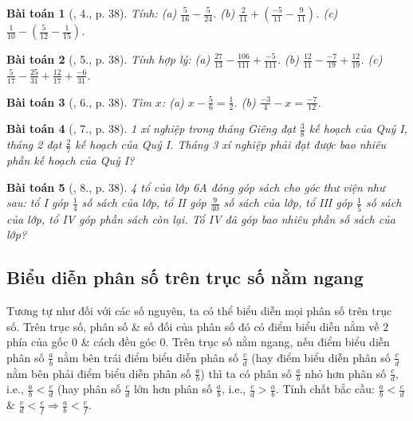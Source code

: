 \documentclass{article}
\newtheorem{baitoan}{Bài toán}
\begin{document}
\begin{baitoan}[\cite{SGK_Toan_6_Canh_Dieu_tap_2}, 4., p. 38]
	Tính: (a) $\frac{5}{16} - \frac{5}{24}$. (b) $\frac{2}{11} + \left(\frac{-5}{11} - \frac{9}{11}\right)$. (c) $\frac{1}{10} - \left(\frac{5}{12} - \frac{1}{15}\right)$.
\end{baitoan}

\begin{baitoan}[\cite{SGK_Toan_6_Canh_Dieu_tap_2}, 5., p. 38]
	Tính hợp lý: (a) $\frac{27}{13} - \frac{106}{111} + \frac{-5}{111}$. (b) $\frac{12}{11} - \frac{-7}{19} + \frac{12}{19}$. (c) $\frac{5}{17} - \frac{25}{31} + \frac{12}{17} + \frac{-6}{31}$.
\end{baitoan}

\begin{baitoan}[\cite{SGK_Toan_6_Canh_Dieu_tap_2}, 6., p. 38]
	Tìm $x$: (a) $x - \frac{5}{6} = \frac{1}{2}$. (b) $\frac{-3}{4} - x = \frac{-7}{12}$.
\end{baitoan}

\begin{baitoan}[\cite{SGK_Toan_6_Canh_Dieu_tap_2}, 7., p. 38]
	1 xí nghiệp trong tháng Giêng đạt $\frac{3}{8}$ kế hoạch của Quý I, tháng 2 đạt $\frac{2}{7}$ kế hoạch của Quý I. Tháng 3 xí nghiệp phải đạt được bao nhiêu phần kế hoạch của Quý I?
\end{baitoan}

\begin{baitoan}[\cite{SGK_Toan_6_Canh_Dieu_tap_2}, 8., p. 38]
	4 tổ của lớp 6A đóng góp sách cho góc thư viện như sau: tổ I góp $\frac{1}{4}$ số sách của lớp, tổ II góp $\frac{9}{40}$ số sách của lớp, tổ III góp $\frac{1}{5}$ số sách của lớp, tổ IV góp phần sách còn lại. Tổ IV đã góp bao nhiêu phần số sách của lớp?
\end{baitoan}

\subsection{Biểu diễn phân số trên trục số nằm ngang}
Tương tự như đối với các số nguyên, ta có thể biểu diễn mọi phân số trên trục số. Trên trục số, phân số \& số đối của phân số đó có điểm biểu diễn nằm về 2 phía của gốc 0 \& cách đều góc 0. Trên trục số nằm ngang, nếu điểm biểu diễn phân số $\frac{a}{b}$ nằm bên trái điểm biểu diễn phân số $\frac{c}{d}$ (hay điểm biểu diễn phân số $\frac{c}{d}$ nằm bên phải điểm biểu diễn phân số $\frac{a}{b}$) thì ta có phân số $\frac{a}{b}$ nhỏ hơn phân số $\frac{c}{d}$, i.e., $\frac{a}{b} < \frac{c}{d}$ (hay phân số $\frac{c}{d}$ lớn hơn phân số $\frac{a}{b}$, i.e., $\frac{c}{d} > \frac{a}{b}$. Tính chất bắc cầu: $\frac{a}{b} < \frac{c}{d}$ \& $\frac{c}{d} < \frac{e}{f}\Rightarrow\frac{a}{b} < \frac{e}{f}$.
\end{document}
